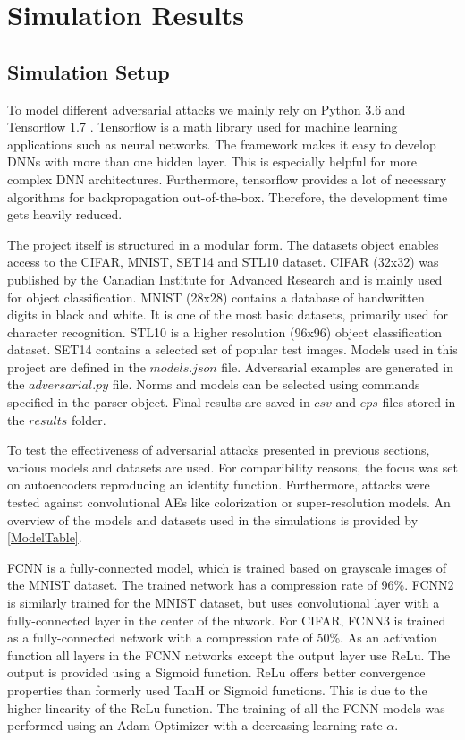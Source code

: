\chapter{Simulation Results}\label{sec:chapter}

\section{Simulation Setup}\label{sec:section}

\begingroup
To model different adversarial attacks we mainly rely on Python 3.6 \cite{Python} and Tensorflow 1.7 \cite{Tensorflow}.
Tensorflow is a math library used for machine learning applications such as neural networks. The framework makes
it easy to develop DNNs with more than one hidden layer. This is especially helpful for more complex DNN architectures.
Furthermore, tensorflow provides a lot of necessary algorithms for backpropagation out-of-the-box. Therefore, the
development time gets heavily reduced.

The project itself is structured in a modular form. The datasets object enables access to the CIFAR, MNIST, SET14
and STL10 dataset. CIFAR (32x32) was published by the Canadian Institute for Advanced Research and is mainly used for object
classification. MNIST (28x28) contains a database of handwritten digits in black and white. It is one of the most
basic datasets, primarily used for character recognition. STL10 is a higher resolution (96x96)
object classification dataset. SET14 contains a selected set of popular test images.
Models used in this project are defined in the $models.json$ file. Adversarial examples are
generated in the $adversarial.py$ file. Norms and models can be selected using commands specified in the parser object. Final
results are saved in $csv$ and $eps$ files stored in the $results$ folder.
\endgroup

\begingroup
To test the effectiveness of adversarial attacks presented in previous sections, various models and datasets are used.
For comparibility reasons, the focus was set on autoencoders reproducing an identity function. Furthermore, attacks
were tested against convolutional AEs like colorization or super-resolution models.
An overview of the models and datasets used in the simulations is provided
by \autoref{ModelTable}.

FCNN is a fully-connected model, which is trained based on grayscale images of the MNIST dataset. The trained network
has a compression rate of 96\%. FCNN2 is similarly trained for the MNIST dataset, but uses convolutional layer with
a fully-connected layer in the center of the ntwork. For CIFAR, FCNN3 is trained as a fully-connected network with a
compression rate of 50\%. As an activation function all layers in the FCNN networks except the output layer use ReLu.
The output is provided using a Sigmoid function. ReLu offers better convergence properties than formerly used
TanH or Sigmoid functions. This is due to the higher linearity of the ReLu function.
The training of all the FCNN models was performed using an Adam Optimizer with a decreasing learning
rate $\alpha$.

